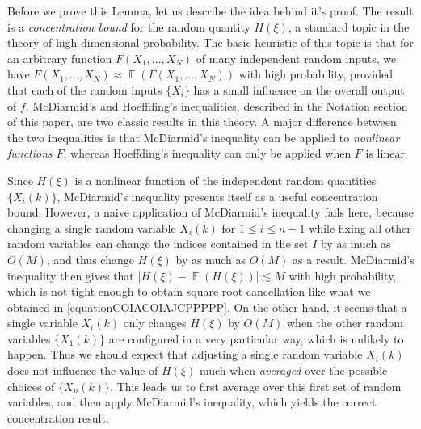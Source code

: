 \documentclass[dvipsnames,letterpaper,12pt]{article}
\numberwithin{equation}{section}
\numberwithin{theorem}{section}
\DeclareMathOperator{\EE}{\mathbb{E}}
\begin{document}
Before we prove this Lemma, let us describe the idea behind it's proof. The result is a \emph{concentration bound} for the random quantity $H(\xi)$, a standard topic in the theory of high dimensional probability. The basic heuristic of this topic is that for an arbitrary function $F(X_1,\dots,X_N)$ of many independent random inputs, we have $F(X_1,\dots,X_N) \approx \EE(F(X_1,\dots,X_N))$ with high probability, provided that each of the random inputs $\{ X_i \}$ has a small influence on the overall output of $f$. McDiarmid's and Hoeffding's inequalities, described in the Notation section of this paper, are two classic results in this theory. A major difference between the two inequalities is that McDiarmid's inequality can be applied to \emph{nonlinear functions} $F$, whereas Hoeffding's inequality can only be applied when $F$ is linear.

Since $H(\xi)$ is a nonlinear function of the independent random quantities $\{ X_i(k) \}$, McDiarmid's inequality presents itself as a useful concentration bound. However, a naive application of McDiarmid's inequality fails here, because changing a single random variable $X_i(k)$ for $1 \leq i \leq n-1$ while fixing all other random variables can change the indices contained in the set $I$ by as much as $O(M)$, and thus change $H(\xi)$ by as much as $O(M)$ as a result. McDiarmid's inequality then gives that $|H(\xi) - \EE(H(\xi))| \lesssim M$ with high probability, which is not tight enough to obtain square root cancellation like what we obtained in \eqref{equationCOIACOIAJCPPPPP}. On the other hand, it seems that a single variable $X_i(k)$ only changes $H(\xi)$ by $O(M)$ when the other random variables $\{ X_1(k) \}$ are configured in a very particular way, which is unlikely to happen. Thus we should expect that adjusting a single random variable $X_i(k)$ does not influence the value of $H(\xi)$ much when \emph{averaged} over the possible choices of $\{ X_n(k) \}$. This leads us to first average over this first set of random variables, and then apply McDiarmid's inequality, which yields the correct concentration result.
\end{document}

